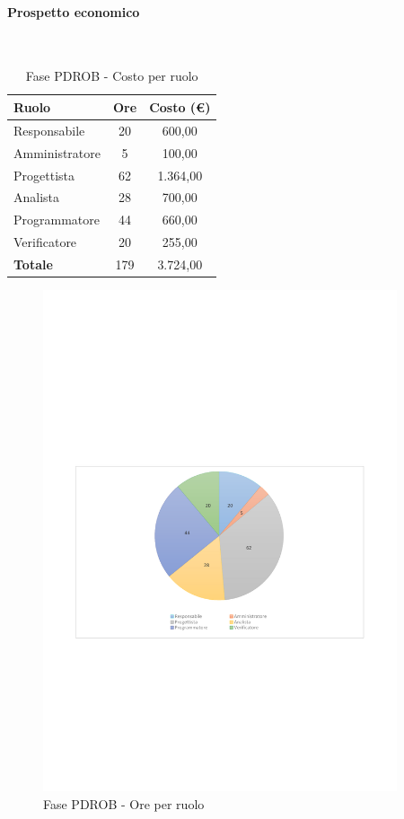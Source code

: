 \documentclass[../PianoProgetto.tex]{subfiles}
\begin{document}
	\paragraph{Prospetto economico}\
					
	\begin{table}[H]
		\centering
	
		\begin{tabular}{l * {2}{c}}
			\toprule
			\textbf{Ruolo} & \textbf{Ore} & \textbf{Costo (\euro{})} \\
			\midrule
			Responsabile & 20    &  600,00 \\
			Amministratore  & 5     &  100,00 \\
			Progettista  & 62    &  1.364,00 \\
			Analista & 28   &  700,00 \\
			Programmatore  & 44    &  660,00 \\
			Verificatore  & 20    &  255,00 \\
			\midrule
			\textbf{Totale}  & 179   &  3.724,00 \\
			\bottomrule		
		\end{tabular}
		\caption{Fase PDROB - Costo per ruolo}
		\label{tab:fasePDROB_costo}
	\end{table}
\vfill	
\newpage
\vfill
	
	\begin{figure}[H]
		\centering
		\includegraphics[width=0.93\textwidth , trim=1.5cm 9cm 1.5cm 9cm]{grafici/PDROB/PDROB-ore-ruolo}
			\caption{Fase PDROB - Ore per ruolo}
		\label{fig:CircleChart-fasePDROB_ore_r}
	\end{figure}
\end{document}
